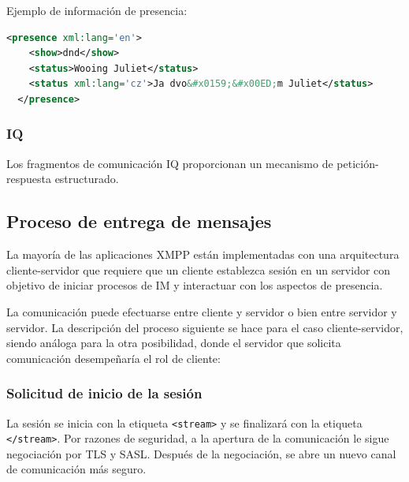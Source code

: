 \documentclass[a4paper, 11pt]{article} %
\begin{document}
      Ejemplo de información de presencia:
  \begin{lstlisting}[language=XML]
  <presence xml:lang='en'>
    <show>dnd</show>
    <status>Wooing Juliet</status>
    <status xml:lang='cz'>Ja dvo&#x0159;&#x00ED;m Juliet</status>
  </presence>
  \end{lstlisting}
  
    \subsubsection{IQ}
      Los fragmentos de comunicación IQ proporcionan un mecanismo de petición-respuesta estructurado.
 
  \subsection{Proceso de entrega de mensajes}
    La mayoría de las aplicaciones XMPP están implementadas con una arquitectura cliente-servidor que requiere que un cliente
    establezca sesión en un servidor con objetivo de iniciar procesos de IM y interactuar con los aspectos de presencia.
    
    La comunicación puede efectuarse entre cliente y servidor o bien entre servidor y servidor.
    La descripción del proceso siguiente se hace para el caso cliente-servidor, siendo análoga para la otra posibilidad, 
    donde el servidor que solicita comunicación desempeñaría el rol de cliente:
  
    \subsubsection{Solicitud de inicio de la sesión}
      La sesión se inicia con la etiqueta \texttt{<stream>} y se finalizará con la etiqueta
      \texttt{</stream>}. Por razones de seguridad, a la apertura de la comunicación le sigue
      negociación por TLS y SASL. Después de la negociación, se abre un nuevo canal de comunicación
      más seguro.
      
\end{document}
